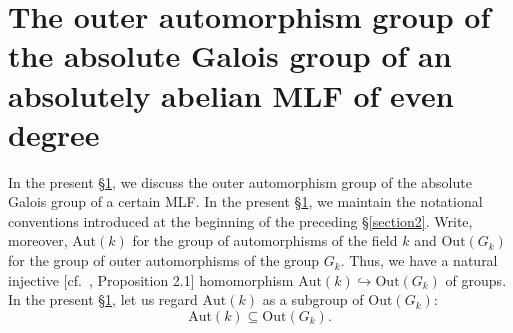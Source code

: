 \documentclass[12pt,showkeys]{amsart}
\theoremstyle{theorem}
\newtheorem{corollary}[theorem]{Corollary}
\theoremstyle{definition}
\begin{document}
\begin{comment}
\begin{corollary}\label{corollary:2.12}
Let $k$ be an absolutely abelian MLF such that $p_k$ is odd, and $d_k$ is even. Then the following hold: 
   \begin{enumerate}[label=(\arabic*),ref=(\arabic*)]
   	\item[\rm (i)] The group of group-theoretic automorphisms of $k_+$ is infinite. \label{colloraly:2.12:statement:1}
   	\item[\rm (ii)] The image of the natural homomorphism ${\rm Aut}(G_k) \to {\rm Aut}(G_k^{\rm ab})$ is infinite. \label{corollary:2.12:statement:2}
   	\item[\rm (iii)] The group of group-theoretic automorphisms of $k^\times$ is infinite. \label{corollary:2.12:statement:3}    
   \end{enumerate}
\end{corollary}
\begin{proof}
Assertion (i) follows from Theorem \ref{one:theorem:2.8}. 
Assertion (ii) follows from assertion (i). 
Assertion (iii) follows from assertion (ii) and  the density of $k^\times(G_k)$ in $G_k^{\rm ab}$ [cf.\ \cite{Hoshi1}, Definition 3.10, (iv)]．
\end{proof}
\end{comment}

\section{The outer automorphism group of the absolute Galois group of an absolutely abelian MLF of even degree}\label{section3}

In the present \S \ref{section3}, we discuss the outer automorphism
group of the absolute Galois group of a certain MLF.  In the present
\S \ref{section3}, we maintain the notational conventions introduced
at the beginning of the preceding \S \ref{section2}.  Write, moreover, $\mathrm{Aut}(k)$ for the group of automorphisms of the field $k$ and $\mathrm{Out}(G_k)$ for the group of outer automorphisms of the group $G_k$.  Thus, we have a natural injective [cf.\ \cite{Hoshi1}, Proposition 2.1] homomorphism $\mathrm{Aut}(k) \hookrightarrow \mathrm{Out}(G_k)$ of groups.  In the present \S \ref{section3}, let us regard $\mathrm{Aut}(k)$ as a subgroup of $\mathrm{Out}(G_k)$:  
\[
\mathrm{Aut}(k) \subseteq \mathrm{Out}(G_k).  
\]
\end{document}

